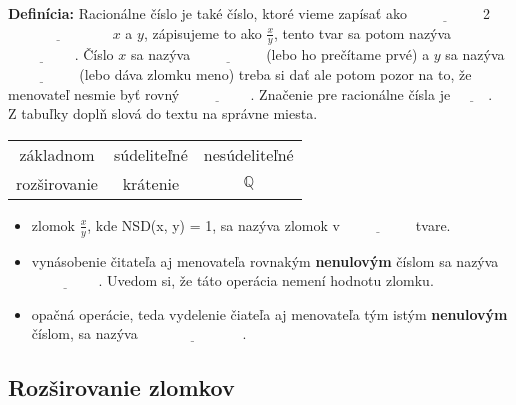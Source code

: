 \documentclass[12pt]{article}
\begin{document}
	\textbf{Definícia:} Racionálne číslo je také číslo, ktoré vieme zapísať ako $\underline{\hspace{2cm}}$ 2 $\underline{\hspace{3cm}}$ $x$ a $y$, zápisujeme to ako $\frac{x}{y}$, tento tvar sa potom nazýva $\underline{\hspace{2cm}}$. Číslo $x$ sa nazýva $\underline{\hspace{2cm}}$ (lebo ho prečítame prvé) a $y$ sa nazýva $\underline{\hspace{2cm}}$ (lebo dáva zlomku meno) treba si dať ale potom pozor na to, že menovateľ nesmie byť rovný $\underline{\hspace{2cm}}$. Značenie pre racionálne čísla je $\underline{\hspace{1cm}}$.\\
	
	
	Z tabuľky doplň slová do textu na správne miesta.\\
	\begin{table}[!hbt]
		\centering
		\begin{tabular}{|ccc|}
			\hline
			základnom& súdeliteľné& nesúdeliteľné\\
			rozširovanie& krátenie& $\mathbb{Q}$\\
			\hline
		\end{tabular}
	\end{table}
	
	\begin{itemize}
		\item zlomok $\frac{x}{y}$, kde NSD(x, y) = 1, sa nazýva zlomok v $\underline{\hspace{2cm}}$ tvare.
		\item vynásobenie čitateľa aj menovateľa rovnakým \textbf{nenulovým} číslom sa nazýva $\underline{\hspace{2cm}}$. Uvedom si, že táto operácia nemení hodnotu zlomku.
		\item opačná operácie, teda vydelenie čiateľa aj menovateľa tým istým \textbf{nenulovým} číslom, sa nazýva $\underline{\hspace{3cm}}$.
	\end{itemize}
	
	
	\subsection{Rozširovanie zlomkov}
	
	
\end{document}
